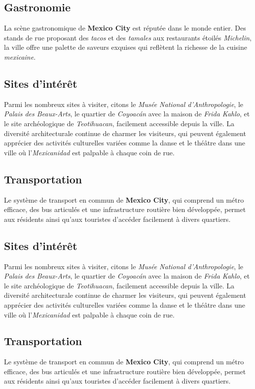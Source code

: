 \documentclass[12pt, a4paper]{article}
\begin{document}
\subsection*{\textbf{Gastronomie}}

La scène gastronomique de \textbf{Mexico City} est réputée dans le monde entier. Des stands de rue proposant des \textit{tacos} et des \textit{tamales} aux restaurants étoilés \textit{Michelin}, la ville offre une palette de saveurs exquises qui reflètent la richesse de la cuisine \textit{mexicaine}.
\subsection*{\textbf{Sites d'intérêt}}

Parmi les nombreux sites à visiter, citons le \textit{Musée National d'Anthropologie}, le \textit{Palais des Beaux-Arts}, le quartier de \textit{Coyoacán} avec la maison de \textit{Frida Kahlo}, et le site archéologique de \textit{Teotihuacan}, facilement accessible depuis la ville.
La diversité architecturale continue de charmer les visiteurs, qui peuvent également apprécier des activités culturelles variées comme la danse et le théâtre dans une ville où l'\textit{Mexicanidad} est palpable à chaque coin de rue. \subsection*{\textbf{Transportation}} Le système de transport en commun de \textbf{Mexico City}, qui comprend un métro efficace, des bus articulés et une infrastructure routière bien développée, permet aux résidents ainsi qu'aux touristes d'accéder facilement à divers quartiers.

\subsection*{\textbf{Sites d'intérêt}}

Parmi les nombreux sites à visiter, citons le \textit{Musée National d'Anthropologie}, le \textit{Palais des Beaux-Arts}, le quartier de \textit{Coyoacán} avec la maison de \textit{Frida Kahlo}, et le site archéologique de \textit{Teotihuacan}, facilement accessible depuis la ville.
La diversité architecturale continue de charmer les visiteurs, qui peuvent également apprécier des activités culturelles variées comme la danse et le théâtre dans une ville où l'\textit{Mexicanidad} est palpable à chaque coin de rue. \subsection*{\textbf{Transportation}} Le système de transport en commun de \textbf{Mexico City}, qui comprend un métro efficace, des bus articulés et une infrastructure routière bien développée, permet aux résidents ainsi qu'aux touristes d'accéder facilement à divers quartiers.
\end{document}
